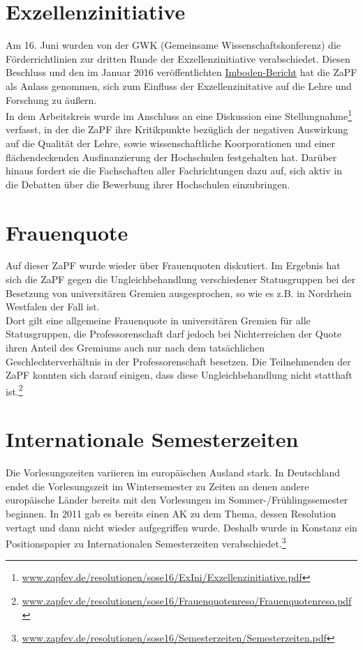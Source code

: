 \section*{Exzellenzinitiative}
Am 16. Juni wurden von der GWK (Gemeinsame Wissenschaftskonferenz) die Förderrichtlinien 
zur dritten Runde der Exzellenzinitiative verabschiedet. Diesen Beschluss und den im Januar 2016 veröffentlichten \href{http://www.gwk-bonn.de/fileadmin/Papers/Imboden-Bericht-2016.pdf}{Imboden-Bericht} hat 
die ZaPF als Anlass genommen, sich zum Einfluss der Exzellenzinitative auf die Lehre und Forschung zu äußern. \\
In dem Arbeitskreis wurde im Anschluss an eine Diskussion eine Stellungnahme\footnote{\href{http://www.zapfev.de/resolutionen/sose16/ExIni/Exzellenzinitiative.pdf}{\url{www.zapfev.de/resolutionen/sose16/ExIni/Exzellenzinitiative.pdf}}} verfasst, in der die ZaPF 
ihre Kritikpunkte bezüglich der negativen Auswirkung auf die Qualität der Lehre, sowie wissenschaftliche 
Koorporationen und einer flächendeckenden Ausfinanzierung der Hochschulen festgehalten hat. Darüber hinaus fordert 
sie die Fachschaften aller Fachrichtungen dazu auf, sich aktiv in die Debatten über die Bewerbung ihrer Hochschulen einzubringen. 

\section*{Frauenquote}
Auf dieser ZaPF wurde wieder über Frauenquoten diskutiert. Im Ergebnis hat sich die ZaPF 
gegen die Ungleichbehandlung verschiedener Statusgruppen bei der Besetzung von universitären 
Gremien ausgesprochen, so wie es z.B. in Nordrhein Westfalen der Fall ist. \\
Dort gilt eine allgemeine Frauenquote in universitären Gremien für alle Statusgruppen, die 
Professorenschaft darf jedoch bei Nichterreichen der Quote ihren Anteil des Gremiums 
auch nur nach dem tatsächlichen Geschlechterverhältnis in der Professorenschaft besetzen. 
Die Teilnehmenden der ZaPF konnten sich darauf einigen, dass diese Ungleichbehandlung nicht statthaft ist.\footnote{\href{http://www.zapfev.de/resolutionen/sose16/Frauenquotenreso/Frauenquotenreso.pdf}{\url{www.zapfev.de/resolutionen/sose16/Frauenquotenreso/Frauenquotenreso.pdf}}}


\section*{Internationale Semesterzeiten}
Die Vorlesungszeiten variieren im europäischen Ausland stark. In Deutschland endet die Vorlesungszeit im 
Wintersemester zu Zeiten an denen andere europäische Länder bereits mit den Vorlesungen im Sommer-/Frühlingssemester beginnen. In 2011 gab es bereits einen AK zu dem Thema, dessen Resolution vertagt und dann nicht 
wieder aufgegriffen wurde. Deshalb wurde in Konstanz ein Positionspapier zu Internationalen Semesterzeiten verabschiedet.\footnote{\href{http://www.zapfev.de/resolutionen/sose16/Semesterzeiten/Semesterzeiten.pdf}{\url{www.zapfev.de/resolutionen/sose16/Semesterzeiten/Semesterzeiten.pdf}}}



